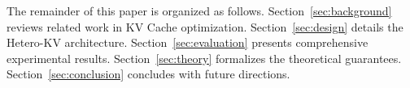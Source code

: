 The remainder of this paper is organized as follows. Section~\ref{sec:background} reviews related work in KV Cache optimization. Section~\ref{sec:design} details the Hetero-KV architecture. Section~\ref{sec:evaluation} presents comprehensive experimental results. Section~\ref{sec:theory} formalizes the theoretical guarantees. Section~\ref{sec:conclusion} concludes with future directions.
